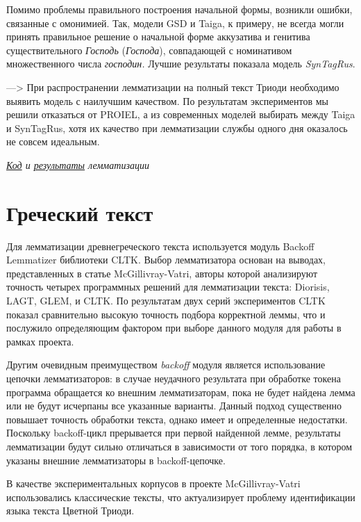 \documentclass[
  letterpaper,
]{book}
\begin{document}
Помимо проблемы правильного построения начальной формы, возникли ошибки,
связанные с омонимией. Так, модели GSD и Taiga, к примеру, не всегда
могли принять правильное решение о начальной форме аккузатива и генитива
существительного \emph{Господь} (\emph{Господа}), совпадающей с
номинативом множественного числа \emph{господин.} Лучшие результаты
показала модель \emph{SynTagRus}.

---\textgreater{} При распространении лемматизации на полный текст
Триоди необходимо выявить модель с наилучшим качеством. По результатам
экспериментов мы решили отказаться от PROIEL, а из современных моделей
выбирать между Taiga и SynTagRus, хотя их качество при лемматизации
службы одного дня оказалось не совсем идеальным.

\emph{\href{https://github.com/Drozhzhinastya/GSPC/tree/main/scripts/lemmatization}{Код}
и
\href{https://github.com/Drozhzhinastya/GSPC/tree/main/lemmatization/csl}{результаты}
лемматизации}

\hypertarget{ux433ux440ux435ux447ux435ux441ux43aux438ux439-ux442ux435ux43aux441ux442}{%
\section{Греческий
текст}\label{ux433ux440ux435ux447ux435ux441ux43aux438ux439-ux442ux435ux43aux441ux442}}

Для лемматизации древнегреческого текста используется модуль Backoff
Lemmatizer библиотеки CLTK. Выбор лемматизатора основан на выводах,
представленных в статье McGillivray-Vatri, авторы которой анализируют
точность четырех программных решений для лемматизации текста: Diorisis,
LAGT, GLEM, и CLTK. По результатам двух серий экспериментов CLTK показал
сравнительно высокую точность подбора корректной леммы, что и послужило
определяющим фактором при выборе данного модуля для работы в рамках
проекта.

Другим очевидным преимуществом \emph{backoff} модуля является
использование цепочки лемматизаторов: в случае неудачного результата при
обработке токена программа обращается ко внешним лемматизаторам, пока не
будет найдена лемма или не будут исчерпаны все указанные варианты.
Данный подход существенно повышает точность обработки текста, однако
имеет и определенные недостатки. Поскольку backoff-цикл прерывается при
первой найденной лемме, результаты лемматизации будут сильно отличаться
в зависимости от того порядка, в котором указаны внешние лемматизаторы в
backoff-цепочке.

В качестве экспериментальных корпусов в проекте McGillivray-Vatri
использовались классические тексты, что актуализирует проблему
идентификации языка текста Цветной Триоди.
\end{document}
